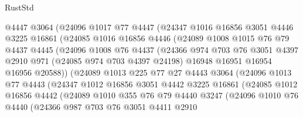 \begin{lexlean}{RustStd}
\begin{coremodule}
              @4447
              @3064
              (@24096
                @1017
                @77
                @4447
                (@24347
                  @1016
                  @16856
                  @3051
                  @4446
                  @3225
                  @16861
                  (@24085
                    @1016
                    @16856
                    @4446
                    (@24089
                      @1008
                      @1015
                      @76
                      @79
                      @4437
                      @4445
                      (@24096
                        @1008
                        @76
                        @4437
                        (@24366
                          @974
                          @703
                          @76
                          @3051
                          @4397
                          @2910
                          @971
                          (@24085 @974 @703 @4397 @24198)
                          @16948
                          @16951
                          @16954
                          @16956
                          @20588))
                      (@24089
                        @1013
                        @225
                        @77
                        @27
                        @4443
                        @3064
                        (@24096
                          @1013
                          @77
                          @4443
                          (@24347
                            @1012
                            @16856
                            @3051
                            @4442
                            @3225
                            @16861
                            (@24085
                              @1012
                              @16856
                              @4442
                              (@24089
                                @1010
                                @355
                                @76
                                @79
                                @4440
                                @3247
                                (@24096
                                  @1010
                                  @76
                                  @4440
                                  (@24366
                                    @987
                                    @703
                                    @76
                                    @3051
                                    @4411
                                    @2910

\end{coremodule}
\end{lexlean}
